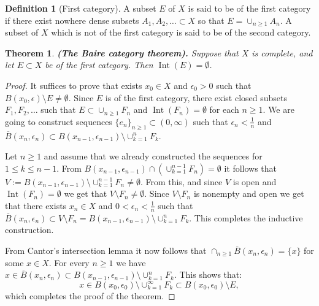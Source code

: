 \documentclass[11pt,a4paper]{article}
\theoremstyle{definition}
\newtheorem{definition}{Definition}[section]
\theoremstyle{plain}
\newtheorem{theorem}{Theorem}[section]
\DeclareMathOperator{\Int}{Int}
\renewcommand{\tt}[1]{\textnormal{\textbf{(#1).}}} %
\begin{document}
  \begin{definition}[First category]
    A subset $E$ of $X$ is said to be of the first category if there exist
    nowhere dense subsets $A_1,A_2,\dots \subset X$ so that 
    $E = \cup_{n \geq 1}{A_n}$. A subset of $X$ which is not of the first 
    category is said to be of the second category.
  \end{definition}

  \begin{theorem}
    \tt{The Baire category theorem}
    Suppose that $X$ is complete, and let $E \subset X$ be of the first
    category. Then $\Int(E) = \emptyset$.
  \end{theorem}
  \begin{proof}
    It suffices to prove that exists $x_0 \in X$ and $\epsilon_0 > 0$ such
    that $B(x_0,\epsilon) \setminus E \neq \emptyset$. Since $E$ is of
    the first category, there exist closed subsets $F_1,F_2,\dots$ such that
    $E \subset \cup_{n \geq 1}{F_n}$ and $\Int(F_n) = \emptyset$ for each
    $n \geq 1$. We are going to construct sequences 
    $\{e_n\}_{n \geq 1} \subset (0,\infty)$ such that 
    $\epsilon_n < \frac{1}{n}$ and $\overline{B}(x_n,\epsilon_n) \subset
    B(x_{n-1},\epsilon_{n-1}) \setminus \cup_{k=1}^{n}{F_k}$. 
    
    Let $n \geq 1$ and assume that we already constructed the sequences
    for $1 \le k \le n-1$. From 
    $B(x_{n-1},\epsilon_{n-1}) \cap (\cup_{k=1}^{n-1}{F_n}) = \emptyset$ 
    it follows that 	
    $V:=B(x_{n-1},\epsilon_{n-1}) \setminus \cup_{k=1}^{n-1}{F_n} 
    \neq \emptyset$. From this, and since $V$ is open and 
    $\Int(F_n) = \emptyset$ we get that $V \setminus F_n \neq \emptyset$.
    Since $V \setminus F_n$ is nonempty and open we get that there exists
    $x_n \in X$ and $0 < \epsilon_n < \frac{1}{n}$ such that
    $\overline{B}(x_n,\epsilon_n) \subset V \setminus F_n = 
    B(x_{n-1},\epsilon_{n-1}) \setminus \cup_{k=1}^{n}{F_k}$.
    This completes the inductive construction.
    
    From Cantor's intersection lemma it now follows that
    $\cap_{n \geq 1}{\overline{B}(x_n,\epsilon_n)} = \{x\}$ for some
    $x \in X$. For every $n \geq 1$ we have 
    $x \in \overline{B}(x_n,\epsilon_n) \subset 
    B(x_{n-1},\epsilon_{n-1}) \setminus \cup_{k=1}^{n}{F_k}$. This
    shows that:
    \[
      x \in B(x_{0},\epsilon_{0}) \setminus \cup_{k=1}^{\infty}{F_k}
      \subset B(x_0,\epsilon_0) \setminus E,
    \]
    which completes the proof of the theorem.
  \end{proof}
   
\end{document}
